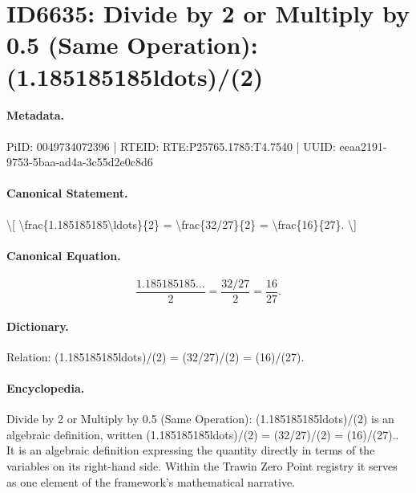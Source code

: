 \section*{ID6635: Divide by 2 or Multiply by 0.5 (Same Operation): (1.185185185ldots)/(2)}
\paragraph{Metadata.}
PiID: 0049734072396 | RTEID: RTE:P25765.1785:T4.7540 | UUID: eeaa2191-9753-5baa-ad4a-3c55d2e0c8d6

\paragraph{Canonical Statement.}
\textbackslash{}[ \textbackslash{}frac\{1.185185185\textbackslash{}ldots\}\{2\} = \textbackslash{}frac\{32/27\}\{2\} = \textbackslash{}frac\{16\}\{27\}. \textbackslash{}]

\paragraph{Canonical Equation.}
\[
\frac{1.185185185\ldots}{2} = \frac{32/27}{2} = \frac{16}{27}.
\]

\paragraph{Dictionary.}
Relation: (1.185185185ldots)/(2) = (32/27)/(2) = (16)/(27).

\paragraph{Encyclopedia.}
Divide by 2 or Multiply by 0.5 (Same Operation): (1.185185185ldots)/(2) is an algebraic definition, written (1.185185185ldots)/(2) = (32/27)/(2) = (16)/(27).. It is an algebraic definition expressing the quantity directly in terms of the variables on its right-hand side. Within the Trawin Zero Point registry it serves as one element of the framework's mathematical narrative.

